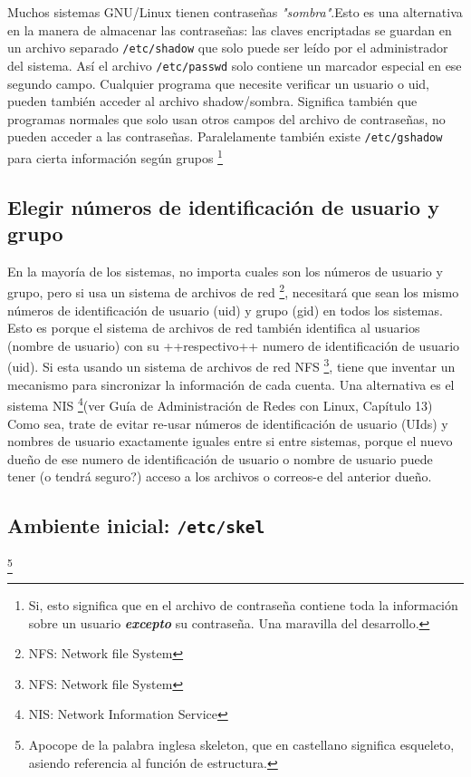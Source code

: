 Muchos sistemas GNU/Linux tienen contraseñas
\textit{"sombra"}.Esto es una  alternativa en la manera de
almacenar las contraseñas: las claves encriptadas se guardan en un archivo
separado \texttt{/etc/shadow} que solo puede ser leído por el
administrador del sistema. Así el archivo \texttt{/etc/passwd} solo
contiene un marcador especial en ese segundo campo. Cualquier programa que
necesite verificar un usuario o uid, pueden también acceder al archivo
shadow/sombra.  Significa también que programas normales que solo usan otros
campos del archivo de contraseñas, no pueden acceder a las contraseñas.
Paralelamente también existe \texttt{/etc/gshadow} para cierta
información según grupos	\footnote{
 Si, esto significa que en el archivo de contraseña contiene toda la
información sobre un usuario \textit{\bf excepto} su contraseña. Una maravilla del
desarrollo.}

	
	


\subsection{  Elegir números de identificación de usuario y grupo}

En la mayoría de los sistemas, no importa cuales son los números de
usuario y grupo, pero si usa un sistema de archivos de red 
	\footnote{NFS: Network file System}, necesitará que
sean los mismo números de identificación de usuario (uid) y grupo (gid) en todos
los sistemas. Esto es porque el sistema de archivos de red también identifica al
usuarios (nombre de usuario) con su ++respectivo++ numero de identificación de
usuario (uid).  Si esta usando un sistema de archivos de red NFS
\footnote{NFS: Network file System}, tiene que inventar un mecanismo para sincronizar la información de cada
cuenta. Una alternativa es el sistema NIS
	\footnote{NIS:
	Network Information Service}(ver Guía de Administración de
Redes con Linux, Capítulo 13) Como sea, trate de evitar re-usar
números de identificación de usuario (UIds) y nombres de usuario exactamente
iguales entre si entre sistemas, porque el nuevo dueño de ese numero de
identificación de usuario o nombre de usuario puede tener (o tendrá seguro?)
acceso a los archivos o correos-e del anterior dueño.








\subsection{Ambiente inicial: \texttt{/etc/skel}}
 	\footnote{ Apocope de la palabra inglesa
 	skeleton, que en castellano significa esqueleto, asiendo referencia al función
 de estructura.}

